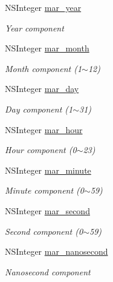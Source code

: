 \begin{Indent}
{ }\begin{DoxyCompactItemize}
\item 
N\+S\+Integer \hyperlink{category_n_s_date_07_m_a_r_e_x_08_a0ca4cc1d8c2edf31fd1c01ded29d5b71}{mar\+\_\+year}
\begin{DoxyCompactList}\small\item\em Year component \end{DoxyCompactList}\item 
N\+S\+Integer \hyperlink{category_n_s_date_07_m_a_r_e_x_08_aef5e9a8e1faa94c59f59e88f9134e6af}{mar\+\_\+month}
\begin{DoxyCompactList}\small\item\em Month component (1$\sim$12) \end{DoxyCompactList}\item 
N\+S\+Integer \hyperlink{category_n_s_date_07_m_a_r_e_x_08_a14a74fc02f2557fa6082ae5ae2c752eb}{mar\+\_\+day}
\begin{DoxyCompactList}\small\item\em Day component (1$\sim$31) \end{DoxyCompactList}\item 
N\+S\+Integer \hyperlink{category_n_s_date_07_m_a_r_e_x_08_a69e0a95fbcdf39f3fa1bab3b2d578e84}{mar\+\_\+hour}
\begin{DoxyCompactList}\small\item\em Hour component (0$\sim$23) \end{DoxyCompactList}\item 
N\+S\+Integer \hyperlink{category_n_s_date_07_m_a_r_e_x_08_aa69aca8a0c8641f0ced5ebd845836f6d}{mar\+\_\+minute}
\begin{DoxyCompactList}\small\item\em Minute component (0$\sim$59) \end{DoxyCompactList}\item 
N\+S\+Integer \hyperlink{category_n_s_date_07_m_a_r_e_x_08_a8ba2cdbdc1c2be1e00f657603fcc190b}{mar\+\_\+second}
\begin{DoxyCompactList}\small\item\em Second component (0$\sim$59) \end{DoxyCompactList}\item 
N\+S\+Integer \hyperlink{category_n_s_date_07_m_a_r_e_x_08_a40a4fa56540c5f89b2ebf4130d0cc35b}{mar\+\_\+nanosecond}
\begin{DoxyCompactList}\small\item\em Nanosecond component \end{DoxyCompactList}\item 

\end{DoxyCompactItemize}
\end{Indent}
